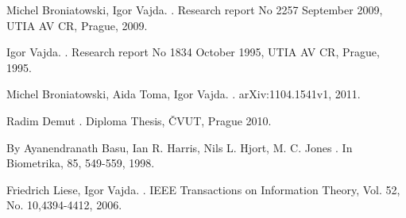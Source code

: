 \documentclass[11pt,a4paper]{article}
\theoremstyle{definition}
\theoremstyle{theorem}
\begin{document}
\begin{thebibliography}{99.}

Michel Broniatowski, Igor Vajda.
.
\newblock Research report No 2257 September 2009, UTIA AV CR, Prague, 2009.

Igor Vajda.
.
\newblock Research report No 1834 October 1995, UTIA AV CR, Prague, 1995.

Michel Broniatowski, Aida Toma, Igor Vajda.
.
\newblock arXiv:1104.1541v1, 2011.

Radim Demut
.
\newblock Diploma Thesis, ČVUT, Prague 2010.

By Ayanendranath Basu, Ian R. Harris, Nils L. Hjort, M. C. Jones
.
\newblock In Biometrika, 85, 549-559, 1998.

Friedrich Liese, Igor Vajda.
.
\newblock IEEE Transactions on Information Theory, Vol. 52, No. 10,4394-4412, 2006.

\end{thebibliography}
\end{document}
